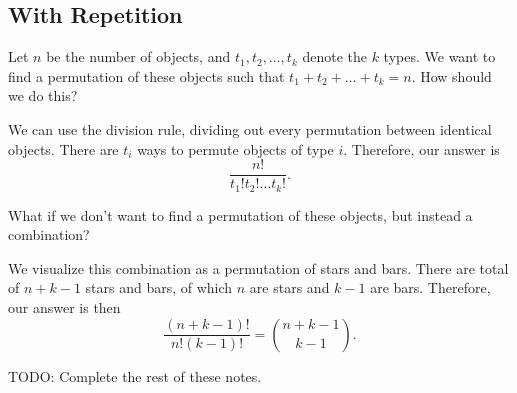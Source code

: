 
\subsection{With Repetition}

\begin{eg}
	Let \( n \) be the number of objects, and \( t_{1},t_{2},\ldots ,t_k \) denote the \( k \) types. We want to find a permutation of these objects such that  \( t_{1} + t_{2} + \ldots  + t_k = n \). How should we do this?
\end{eg}

We can use the division rule, dividing out every permutation between identical objects. There are \( t_{i} \) ways to permute objects of type \( i \). Therefore, our answer is \[
	\frac{n!}{t_{1}!t_{2}!\ldots t_k!}
.\] 

\begin{eg}
	What if we don't want to find a permutation of these objects, but instead a combination?
\end{eg}

We visualize this combination as a permutation of stars and bars. There are total of \( n+k-1 \) stars and bars, of which \( n \) are stars and \( k-1 \) are bars. Therefore, our answer is then \[
	\frac{(n+k-1)!}{n!(k-1)!} = \binom{n+k-1}{k-1}
.\] 

TODO: Complete the rest of these notes.
